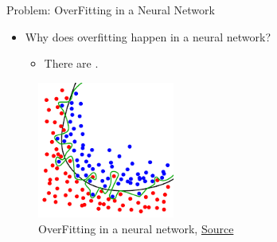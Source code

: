 \begin{frame}{Problem: OverFitting in a Neural Network}
	\begin{itemize}
		\item Why does overfitting happen in a neural network?
		\begin{itemize}
			\item There are .
		\end{itemize}
	\end{itemize}
    \begin{figure}[H]
        \centering
        \includegraphics[width=0.4\textwidth]{Figs/section_4/overfitting.png}
        \caption{OverFitting in a neural network, \href{https://en.wikipedia.org/wiki/Overfitting}{Source}}
    \end{figure}
\end{frame}

